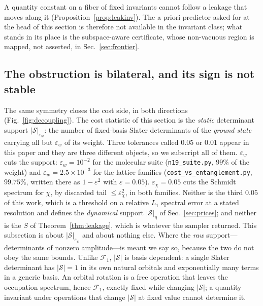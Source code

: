 %
%

%
%
A quantity constant on a fiber of fixed invariants cannot follow a leakage that moves along it
(Proposition~\ref{prop:leakinv}). The a priori
predictor asked for at the head of this section is therefore not available in the invariant class; what stands in its
place is the subspace-aware certificate, whose non-vacuous region is mapped, not asserted, in
Sec.~\ref{sec:frontier}.

\subsection{The obstruction is bilateral, and its sign is not stable}
\label{sec:nogo:bilateral}

The same symmetry closes the cost side, in both directions (Fig.~\ref{fig:decoupling}). The cost
statistic of this section is the \emph{static} determinant support $|\mathcal S|_{\varepsilon_w}$: the
number of fixed-basis Slater determinants of the \emph{ground state} carrying all but $\varepsilon_w$ of
its weight. Three tolerances called $0.05$ or $0.01$ appear in this paper and they are three different
objects, so we subscript all of them. $\varepsilon_w$ cuts the support: $\varepsilon_w=10^{-2}$ for the
molecular suite (\texttt{n19\_suite.py}, $99\%$ of the weight) and $\varepsilon_w=2.5\times10^{-3}$ for
the lattice families (\texttt{cost\_vs\_entanglement.py}, $99.75\%$, written there as
$1-\varepsilon^{2}$ with $\varepsilon=0.05$). $\varepsilon_\chi=0.05$ cuts the Schmidt spectrum for
$\chi$, by discarded tail $\le\varepsilon_\chi^{2}$, in both families. Neither is the third $0.05$ of
this work, which is a threshold on a relative $L_1$ spectral error at a stated resolution and defines
the \emph{dynamical} support $|\mathcal S|_\eta$ of Sec.~\ref{sec:prices}; and neither is the $S$ of
Theorem~\ref{thm:leakage}, which is whatever the sampler returned. This subsection is about
$|\mathcal S|_{\varepsilon_w}$ and about nothing else. Where the \emph{raw} support---determinants of
nonzero amplitude---is meant we say so, because the two do not obey the same bounds. Unlike $\mathcal F_1$, $|\mathcal S|$ is basis dependent: a
single Slater determinant has $|\mathcal S|=1$ in its own natural orbitals and exponentially many terms in
a generic basis. An orbital rotation is a free operation that leaves the occupation spectrum, hence
$\mathcal F_1$, exactly fixed while changing $|\mathcal S|$; a quantity invariant under operations that
change $|\mathcal S|$ at fixed value cannot determine it.

